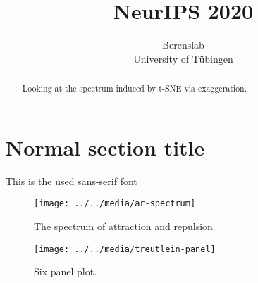 \documentclass{article}
\title{NeurIPS 2020}
\author{%
  Berenslab\\
  University of Tübingen\\
}
\begin{document}
\maketitle

\begin{abstract}
  Looking at the spectrum induced by t-SNE via exaggeration.
\end{abstract}

\section{Normal section title}

This is the used \textsf{sans-serif font}

\begin{figure}
  \texttt{[image: ../../media/ar-spectrum]}
  \caption{\label{fig:ar-spectrum}The spectrum of attraction and repulsion.}
\end{figure}

\begin{figure}
  \texttt{[image: ../../media/treutlein-panel]}
  \caption{\label{fig:devdata-panel}Six panel plot.}
\end{figure}
\end{document}
